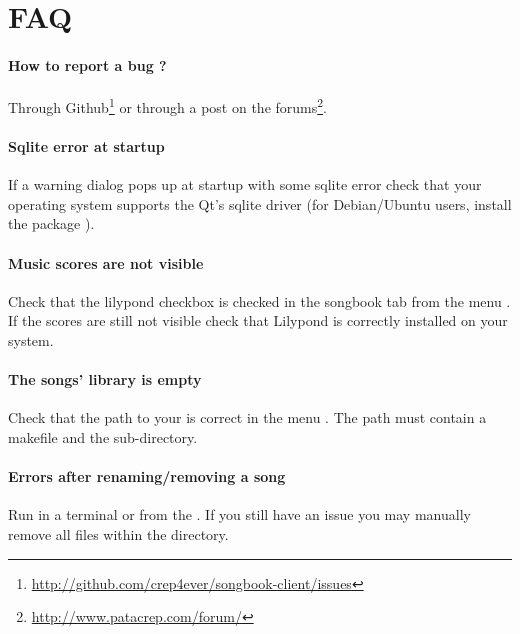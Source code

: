 \section{FAQ}

\paragraph{How to report a bug ?}
Through
Github\footnote{\url{http://github.com/crep4ever/songbook-client/issues}}
or through a post on the
forums\footnote{\url{http://www.patacrep.com/forum/}}.

\paragraph{Sqlite error at startup} 
If a warning dialog pops up at startup with some sqlite error
check that your operating system supports the Qt's sqlite driver (for
Debian/Ubuntu users, install the package ).

\paragraph{Music scores are not visible}
Check that the lilypond checkbox is checked in the songbook tab from
the menu . If the scores are still not visible
check that Lilypond is correctly installed on your system.

\paragraph{The songs' library is empty} 
Check that the path to your \songbook is correct in the menu
. The path must contain a makefile and the
 sub-directory.

\paragraph{Errors after renaming/removing a song} 
Run  in a terminal or  from
the \client. If you still have an issue you may manually remove all
 files within the  directory.
